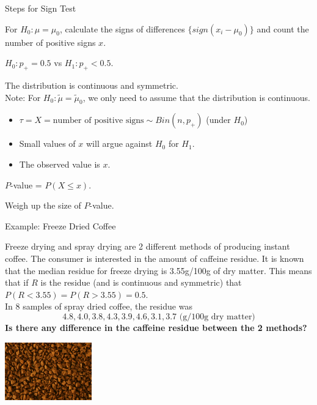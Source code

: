 \documentclass[t,xcolor=pdftex,dvipsnames,table]{beamer}
\begin{document}
\begin{frame}[fragile]{Steps for Sign Test}
 
For $H_{0}: \mu = \mu_{0}$, calculate the signs of differences $\{ sign(x_{i}-\mu_{0}) \}$  and count the number of positive signs $x$.

\vspace{.5cm}
$H_{0}: p_{+} = 0.5$ vs $H_{1}: p_{+} < 0.5$. 

 The distribution is continuous and symmetric.\\
Note: For $H_{0}: \tilde{\mu} = \tilde{\mu}_{0}$, we only need to assume that the distribution is continuous. \\

\begin{itemize}
\item $\tau = X =  \mbox{number of positive signs} \sim Bin(n,p_{+})$ (under $H_{0}$) 
\item Small values of $x$ will argue against $H_{0}$ for $H_{1}$. 
\item The observed value is $x$. 
\end{itemize}

 $P$-value = $P( X \leq x)$.

 Weigh up the size of $P$-value.

\end{frame}  


\begin{frame}{Example: Freeze Dried Coffee}

Freeze drying and spray drying are 2 different methods of producing instant coffee. The consumer is interested in the amount of caffeine residue. It is known that the median residue for freeze drying is 3.55g/100g of dry matter. This means that if $R$ is the residue (and is continuous and symmetric) that
$P(R < 3.55) = P(R > 3.55) = 0.5$. \\

In 8 samples of spray dried coffee, the residue was
\[ 4.8 , 4.0, 3.8, 4.3, 3.9, 4.6, 3.1, 3.7 \mbox{ (g/100g dry matter)} \]
{\bf Is there any difference in the caffeine residue between the 2 methods?}

\begin{center}
\includegraphics[height=2.5cm]{../images/FreezeCoffee.jpg}
\end{center}
\end{frame}
\end{document}
